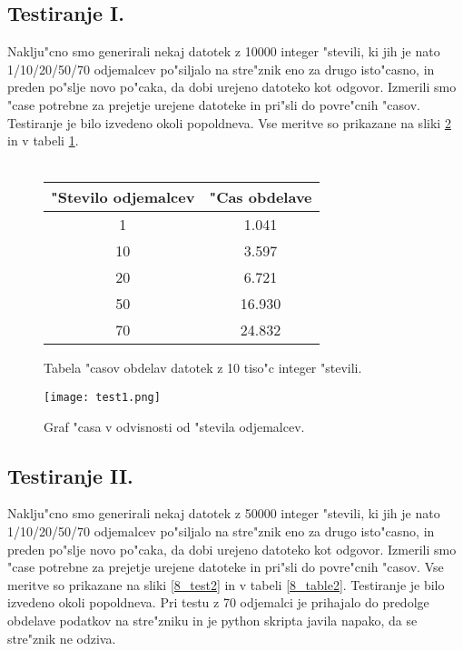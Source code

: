 \subsection{Testiranje I.}
Naklju"cno smo generirali nekaj datotek z 10000 integer "stevili, ki jih je nato 1/10/20/50/70 odjemalcev po"siljalo na stre"znik eno za drugo isto"casno, in preden po"slje novo po"caka, da dobi urejeno datoteko kot odgovor. Izmerili smo "case potrebne za prejetje urejene datoteke in pri"sli do povre"cnih "casov. Testiranje je bilo izvedeno okoli popoldneva. Vse meritve so prikazane na sliki \ref{8_test1} in v tabeli \ref{8_table1}.\\\\

\begin{figure}
  \centering
  \begin{tabular}{ | c | c | }
    \hline
    "Stevilo odjemalcev & "Cas obdelave\\ \hline
	1 & 1.041 \\ \hline
    10 & 3.597 \\ \hline
    20 & 6.721 \\ \hline
    50 & 16.930 \\ \hline
    70 & 24.832 \\ \hline
  \end{tabular}
  \caption{Tabela "casov obdelav datotek z 10 tiso"c integer "stevili.}
  \label{8_table1}
  \centering
\end{figure}

\begin{figure}
  \centering
    \texttt{[image: test1.png]}
  \caption{Graf "casa v odvisnosti od "stevila odjemalcev.}
  \label{8_test1}  
\end{figure}

\subsection{Testiranje II.}
Naklju"cno smo generirali nekaj datotek z 50000 integer "stevili, ki jih je nato 1/10/20/50/70 odjemalcev po"siljalo na stre"znik eno za drugo isto"casno, in preden po"slje novo po"caka, da dobi urejeno datoteko kot odgovor. Izmerili smo "case potrebne za prejetje urejene datoteke in pri"sli do povre"cnih "casov. Vse meritve so prikazane na sliki \ref{8_test2} in v tabeli \ref{8_table2}. Testiranje je bilo izvedeno okoli popoldneva. Pri testu z 70 odjemalci je prihajalo do predolge obdelave podatkov na stre"zniku in je python skripta javila napako, da se stre"znik ne odziva.\\\\

